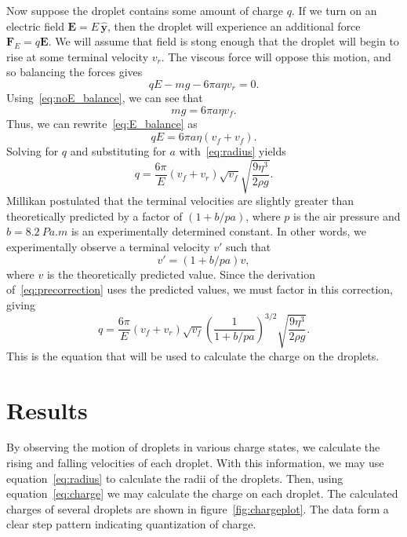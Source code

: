 \documentclass[aps, reprint,amsmath,amssymb]{revtex4-1} %
\renewcommand{\vec}[1]{\mathbf{#1}}
\newcommand{\y}{\vec{\hat{y}}}
\begin{document}
Now suppose the droplet contains some amount of charge $q$. If we turn on
an electric field $\vec{E} = E\,\y$, then the droplet will experience
an additional force $\vec{F}_E = q\vec{E}$. We will assume that field is
stong enough that the droplet will begin to rise at some terminal velocity
$v_r$. The viscous force will oppose this motion, and so balancing the
forces gives
\begin{equation}\label{eq:E_balance}
    qE - mg - 6\pi a \eta v_r = 0.
\end{equation}
Using~\eqref{eq:noE_balance}, we can see that
\[
    m g = 6\pi a \eta v_f.
\]
Thus, we can rewrite~\eqref{eq:E_balance} as
\begin{equation}
    qE = 6\pi a \eta (v_f + v_f).
\end{equation}
Solving for $q$ and substituting for $a$ with~\eqref{eq:radius} yields
\begin{equation}\label{eq:precorrection}
    q = \frac{6\pi}{E} (v_f + v_r) \sqrt{v_f} \sqrt{\frac{9 \eta^3}{2\rho
    g}}.
\end{equation}
Millikan postulated that the terminal velocities are slightly greater than
theoretically predicted by a factor of $(1 + b/pa)$, where $p$ is the air
pressure and $b = \SI{8.2}{Pa.m}$ is an experimentally determined constant.
In other words, we experimentally observe a terminal velocity $v'$ such
that
\[
    v' = (1 + b/pa) v,
\]
where $v$ is the theoretically predicted value. Since the derivation
of~\eqref{eq:precorrection} uses the predicted values, we must factor in
this correction, giving
\begin{equation} \label{eq:charge}
    q = \frac{6\pi}{E} (v_f + v_r) \sqrt{v_f} 
    \left( \frac{1}{1 + b/pa} \right)^{3/2}
    \sqrt{\frac{9\eta^3}{2\rho g}}.
\end{equation}
This is the equation that will be used to calculate the charge on the
droplets.

\section{Results}
By observing the motion of droplets in various charge states, we calculate the rising and falling velocities of each droplet. With this information, we may use equation~\eqref{eq:radius} to calculate the radii of the droplets. Then, using equation~\eqref{eq:charge} we may calculate the charge on each droplet. The calculated charges of several droplets are shown in figure~\ref{fig:chargeplot}. The data form a clear step pattern indicating quantization of charge.
\end{document}

